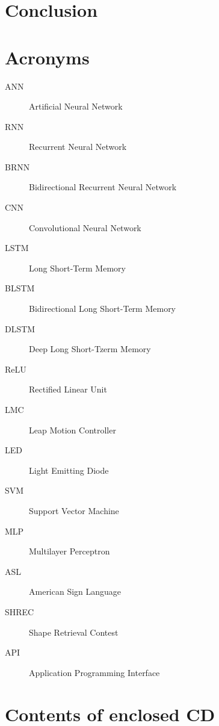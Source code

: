 \documentclass[thesis=B,english]{FITthesis}[2020/10/23]
\begin{document}
	\chapter{Conclusion}\label{ch:conclusion}
	\newpage\cleardoublepage





\appendix

\chapter{Acronyms}
\begin{description}
	\item[ANN] Artificial Neural Network
	\item[RNN] Recurrent Neural Network
	\item[BRNN] Bidirectional Recurrent Neural Network
	\item[CNN] Convolutional Neural Network
	\item[LSTM] Long Short-Term Memory
	\item[BLSTM] Bidirectional Long Short-Term Memory
	\item[DLSTM] Deep Long Short-Tzerm Memory
	\item[ReLU] Rectified Linear Unit
	\item[LMC] Leap Motion Controller
	\item[LED] Light Emitting Diode 
	\item[SVM] Support Vector Machine
	\item[MLP] Multilayer Perceptron
	\item[ASL] American Sign Language
	\item[SHREC] Shape Retrieval Contest  
	\item[API] Application Programming Interface
\end{description}


\chapter{Contents of enclosed CD}


\begin{figure}
\end{figure}
\end{document}
